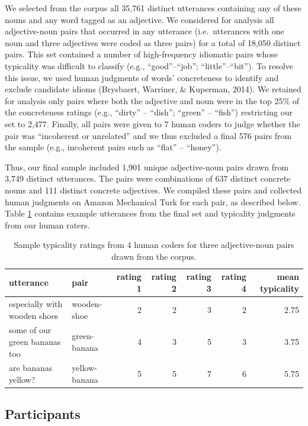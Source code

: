 \documentclass[10pt, letterpaper]{article}
\begin{document}
We selected from the corpus all 35,761 distinct utterances containing
any of these nouns and any word tagged as an adjective. We considered
for analysis all adjective-noun pairs that occurred in any utterance
(i.e.~utterances with one noun and three adjectives were coded as three
pairs) for a total of 18,050 distinct pairs. This set contained a number
of high-frequency idiomatic pairs whose typicality was difficult to
classify (e.g., ``good''--``job''; ``little''--``bit''). To resolve this
issue, we used human judgments of words' concreteness to identify and
exclude candidate idioms (Brysbaert, Warriner, \& Kuperman, 2014). We
retained for analysis only pairs where both the adjective and noun were
in the top 25\% of the concreteness ratings (e.g., ``dirty'' --
``dish''; ``green'' -- ``fish'') restricting our set to 2,477. Finally,
all pairs were given to 7 human coders to judge whether the pair was
``incoherent or unrelated'' and we thus excluded a final 576 pairs from
the sample (e.g., incoherent pairs such as ``flat'' -- ``honey'').

Thus, our final sample included 1,901 unique adjective-noun pairs drawn
from 3,749 distinct utterances. The pairs were combinations of 637
distinct concrete nouns and 111 distinct concrete adjectives. We
compiled these pairs and collected human judgments on Amazon Mechanical
Turk for each pair, as described below. Table \ref{tab:utt_table}
contains example utterances from the final set and typicality judgments
from our human raters.

\begin{table}[tb]
\centering
\begin{tabular}{llrrrrr}
  \hline
utterance & pair & rating 1 & rating 2 & rating 3 & rating 4 & mean typicality \\ 
  \hline
especially with wooden shoes & wooden-shoe &   2 &   2 &   3 &   2 & 2.75 \\ 
  some of our green bananas too & green-banana &   4 &   3 &   5 &   3 & 3.75 \\ 
  are bananas yellow? & yellow-banana &   5 &   5 &   7 &   6 & 5.75 \\ 
   \hline
\end{tabular}
\caption{Sample typicality ratings from 4 human coders for three adjective-noun pairs drawn from the corpus.} 
\label{tab:utt_table}
\end{table}

\hypertarget{participants}{%
\subsection{Participants}\label{participants}}
\end{document}
